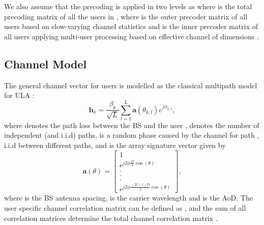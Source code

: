 \documentclass{article}
\begin{document}
We also assume that the precoding is applied in two levels as  where  is the total precoding matrix of all the users in , where  is the outer precoder matrix of all users based on slow-varying channel statistics and  is the inner precoder matrix of all users applying multi-user processing based on effective channel  of dimensions . 
\vspace{-1eM}

\subsection{Channel Model}
\label{chan_mod}
\vspace{-1eM}
The general channel vector  for  users is modelled as the classical multipath model for \ac{ULA} \cite{molisch2012wireless}:
\begin{equation}\label{icassp2}
\mathbf{h}_k = \dfrac{\beta_k}{\sqrt{L}} \sum_{l=1}^{L} \mathbf{a}(\theta_{k,l})e^{j\phi_{k,l}},
\end{equation}
where  denotes the path loss between the \ac{BS} and the user ,  denotes the number of independent (and \ac{i.i.d}) paths,  is a random phase caused by the channel for path , \ac{i.i.d} between different paths, and  is the array signature vector given by
\begin{equation} \label{icassp3}
\mathbf{a}(\theta) = \begin{bmatrix}1\\e^{j2\phi \frac{D}{\lambda}\cos(\theta)}\\. \\. \\. \\e^{j2\phi \frac{(M-1)D}{\lambda}\cos(\theta)}\end{bmatrix},
\end{equation}
where  is the \ac{BS} antenna spacing, \me{\lambda} is the carrier wavelength and \me{\theta} is the \ac{AoD}. The user specific channel correlation matrix can be defined as , and the sum of all correlation matrices determine the total channel correlation matrix .
\vspace{-1eM}
\end{document}
